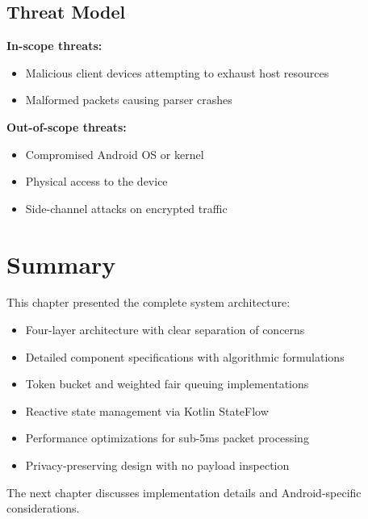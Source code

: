 \subsection{Threat Model}

\textbf{In-scope threats:}
\begin{itemize}
    \item Malicious client devices attempting to exhaust host resources
    \item Malformed packets causing parser crashes
\end{itemize}

\textbf{Out-of-scope threats:}
\begin{itemize}
    \item Compromised Android OS or kernel
    \item Physical access to the device
    \item Side-channel attacks on encrypted traffic
\end{itemize}

\section{Summary}

This chapter presented the complete system architecture:
\begin{itemize}
    \item Four-layer architecture with clear separation of concerns
    \item Detailed component specifications with algorithmic formulations
    \item Token bucket and weighted fair queuing implementations
    \item Reactive state management via Kotlin StateFlow
    \item Performance optimizations for sub-5ms packet processing
    \item Privacy-preserving design with no payload inspection
\end{itemize}

The next chapter discusses implementation details and Android-specific considerations.
